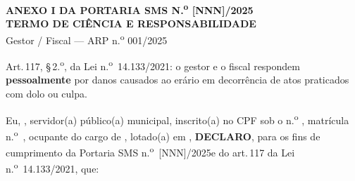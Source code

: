 \documentclass[12pt,a4paper]{article}
\newcommand{\art}[1]{art.\,#1}
\newcommand{\blank}[1]{\underline{\hspace{#1}}}
\newcommand{\portNum}{[NNN]}          %
\newcommand{\exercicio}{2025}
\newcommand{\arpRef}{ARP n.\textsuperscript{o} 001/2025}
\begin{document}
\clearpage
\begin{center}
  \textbf{\large\color{navy}ANEXO I DA PORTARIA SMS N.\textsuperscript{o}
    \portNum/\exercicio}\\[6pt]
  \textbf{\large TERMO DE CIÊNCIA E RESPONSABILIDADE}\\[4pt]
  {\normalsize Gestor / Fiscal --- \arpRef}
\end{center}

\vspace{0.5cm}
\begin{legalbox}[Fundamentação]
\small Art.\,117, \S\,2.\textsuperscript{o}, da Lei n.\textsuperscript{o}~14.133/2021:
o gestor e o fiscal respondem \textbf{pessoalmente} por danos causados ao erário
em decorrência de atos praticados com dolo ou culpa.
\end{legalbox}

\vspace{0.4cm}
\noindent Eu, \blank{7cm}, servidor(a) público(a) municipal, inscrito(a) no
CPF sob o n.\textsuperscript{o} \blank{4cm}, matrícula
n.\textsuperscript{o}~\blank{3cm}, ocupante do cargo de \blank{6cm},
lotado(a) em \blank{5cm}, \textbf{DECLARO}, para os fins de cumprimento da
Portaria SMS n.\textsuperscript{o}~\portNum/\exercicio e do \art{117} da Lei
n.\textsuperscript{o}~14.133/2021, que:
\end{document}
